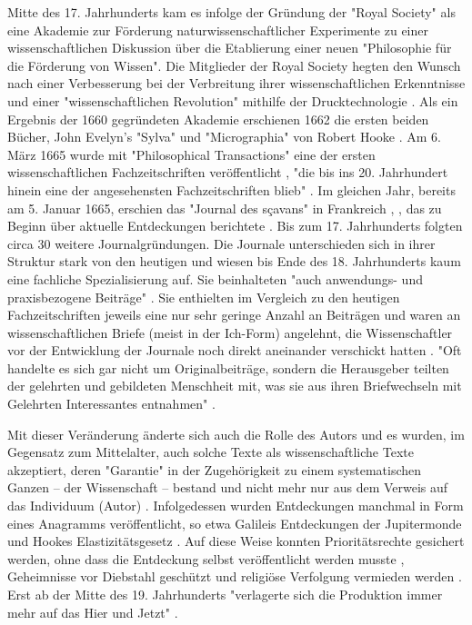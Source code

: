Mitte des 17. Jahrhunderts kam es infolge der Gründung der "Royal Society" als eine Akademie zur Förderung naturwissenschaftlicher Experimente zu einer wissenschaftlichen Diskussion über die Etablierung einer neuen "Philosophie für die Förderung von Wissen". Die Mitglieder der Royal Society hegten den Wunsch nach einer Verbesserung bei der Verbreitung ihrer wissenschaftlichen Erkenntnisse und einer "wissenschaftlichen Revolution" mithilfe der Drucktechnologie \cite{Dear_1985}. Als ein Ergebnis der 1660 gegründeten Akademie erschienen 1662 die ersten beiden Bücher, John Evelyn's "Sylva" und "Micrographia" von Robert Hooke \cite{hall_1992_library_rsol}. Am 6. März 1665 wurde mit "Philosophical Transactions" eine der ersten wissenschaftlichen Fachzeitschriften veröffentlicht \cite{Peters_2014}, "die bis ins 20. Jahrhundert hinein eine der angesehensten Fachzeitschriften blieb" \cite{graefen2007_wissenschaftliche_artikel}. Im gleichen Jahr, bereits am  5. Januar 1665, erschien das "Journal des sçavans" in Frankreich \cite{ball_2011_zeitalter}, \cite{hollricher_wandel_2009}, das zu Beginn über aktuelle Entdeckungen berichtete \cite{epaa_Weiner_2001}. Bis zum 17. Jahrhunderts folgten circa 30 weitere Journalgründungen. Die Journale unterschieden sich in ihrer Struktur stark von den heutigen und wiesen bis Ende des 18. Jahrhunderts kaum eine fachliche Spezialisierung auf. Sie beinhalteten "auch anwendungs- und praxisbezogene Beiträge" \cite{graefen2007_wissenschaftliche_artikel}. Sie enthielten im Vergleich zu den heutigen Fachzeitschriften jeweils eine nur sehr geringe Anzahl an Beiträgen und waren an wissenschaftlichen Briefe (meist in der Ich-Form) angelehnt, die Wissenschaftler vor der Entwicklung der Journale noch direkt aneinander verschickt hatten \cite{epaa_Weiner_2001}. "Oft handelte es sich gar nicht um Originalbeiträge, sondern die Herausgeber teilten der gelehrten und gebildeten Menschheit mit, was sie aus ihren Briefwechseln mit Gelehrten Interessantes entnahmen" \cite{graefen2007_wissenschaftliche_artikel}.

Mit dieser Veränderung änderte sich auch die Rolle des Autors und es wurden, im Gegensatz zum Mittelalter, auch solche Texte als wissenschaftliche Texte akzeptiert, deren "Garantie" in der Zugehörigkeit zu einem systematischen Ganzen – der Wissenschaft – bestand und nicht mehr nur aus dem Verweis auf das Individuum (Autor) \cite{foucault_2000_autor}. Infolgedessen wurden Entdeckungen manchmal in Form eines Anagramms veröffentlicht, so etwa Galileis Entdeckungen der Jupitermonde \cite{miner2007discovery} und Hookes Elastizitätsgesetz \cite{szabo_2013_geschichte}. Auf diese Weise konnten Prioritätsrechte gesichert werden, ohne dass die Entdeckung selbst veröffentlicht werden musste \cite{miner2007discovery}, Geheimnisse vor Diebstahl geschützt und religiöse Verfolgung vermieden werden \cite{resnik_2005_ethics}. Erst ab der Mitte des 19. Jahrhunderts "verlagerte sich die Produktion immer mehr auf das Hier und Jetzt" \cite{hagner_2015_sache_buches}.

